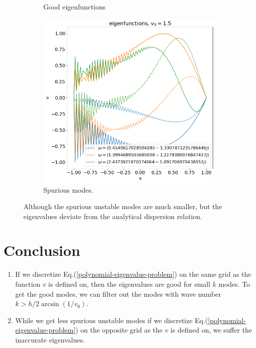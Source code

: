 \documentclass{article}
\begin{document}
\begin{figure}[H]
\begin{subfigure}[b]{0.3\linewidth}
        \caption{Good eigenfunctions}
        \label{fig:results-H-b}
    \end{subfigure}
    \begin{subfigure}[b]{0.3\linewidth}
        \includegraphics[width=\linewidth]{img/eigfuncs-bad-H.png}
        \caption{Spurious modes.} 
        \label{fig:results-H-c}  
    \end{subfigure}
    \caption{Although the spurious unstable modes are much smaller, but the eigenvalues deviate from the analytical dispersion relation.}
    \label{fig:results-H}
\end{figure}

\section{Conclusion}
\begin{enumerate}
    \item If we discretize Eq.(\ref{polynomial-eigenvalue-problem}) on the same grid as the function $v$ is defined on, then the eigenvalues are good for small $k$ modes. To get the good modes, we can filter out the modes with wave number $k>h/2\arcsin(1/v_0)$.
    \item While we get less spurious unstable modes if we discretize Eq.(\ref{polynomial-eigenvalue-problem}) on the opposite grid as the $v$ is defined on, we suffer the inaccurate eigenvalues.
\end{enumerate}






\end{document}
